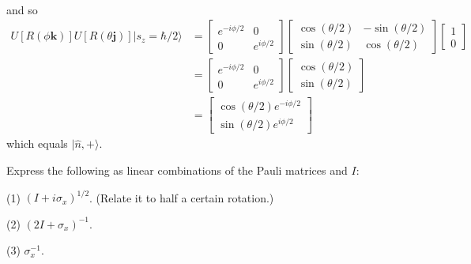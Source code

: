 \documentclass[../principles-of-quantum-mechanics.tex]{subfiles}
\begin{document}
\begin{questions}
\begin{solution}
\begin{align*}
			\end{align*}
			and so
			\begin{align*}
				U[R(\phi\mathbf{k})]U[R(\theta\mathbf{j})]|s_z = \hbar/2\rangle &= \begin{bmatrix}e^{-i\phi/2} & 0 \\ 0 & e^{i\phi/2}\end{bmatrix}\begin{bmatrix}\cos(\theta/2) & -\sin(\theta/2) \\ \sin(\theta/2) & \cos(\theta/2) \end{bmatrix}\begin{bmatrix}1 \\ 0\end{bmatrix} \\
				&= \begin{bmatrix}e^{-i\phi/2} & 0 \\ 0 & e^{i\phi/2}\end{bmatrix}\begin{bmatrix}\cos(\theta/2) \\ \sin(\theta/2) \end{bmatrix} \\
				&= \begin{bmatrix}
					\cos(\theta/2)e^{-i\phi/2} \\
					\sin(\theta/2)e^{i\phi/2}
				\end{bmatrix}
			\end{align*}
			which equals $|\hat{n}, +\rangle$.
		\end{solution}
		
		\question Express the following as linear combinations of the Pauli matrices and $I$:
		
		(1) $(I + i\sigma_x)^{1/2}$. (Relate it to half a certain rotation.)
		
		(2) $(2I + \sigma_x)^{-1}$.
		
		(3) $\sigma_x^{-1}$.
		

\end{questions}
\end{document}
